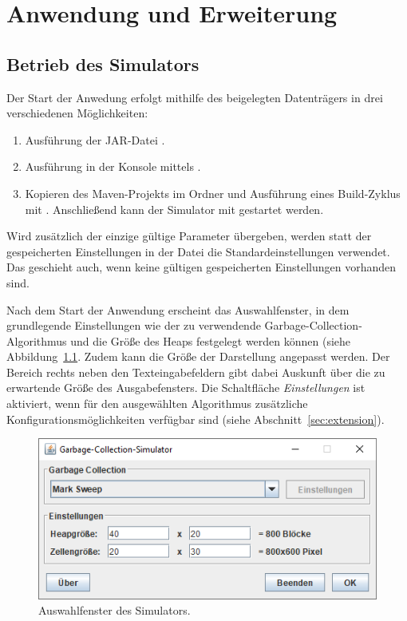 \chapter{Anwendung und Erweiterung}
\label{cha:application}


\section{Betrieb des Simulators}
\label{sec:execution}
Der Start der Anwedung erfolgt mithilfe des beigelegten Datenträgers in drei verschiedenen Möglichkeiten:
\begin{enumerate}
	\item Ausführung der JAR-Datei .
	\item Ausführung in der Konsole mittels .
	\item Kopieren des Maven-Projekts im Ordner  und Ausführung eines Build-Zyklus mit .
	Anschließend kann der Simulator mit  gestartet werden.
\end{enumerate}

Wird zusätzlich der einzige gültige Parameter  übergeben, werden statt der gespeicherten Einstellungen in der Datei  die Standardeinstellungen verwendet.
Das geschieht auch, wenn keine gültigen gespeicherten Einstellungen vorhanden sind.

Nach dem Start der Anwendung erscheint das Auswahlfenster, in dem grundlegende Einstellungen wie der zu verwendende Garbage-Collection-Algorithmus und die Größe des Heaps festgelegt werden können (siehe Abbildung~\ref{fig:app-start}.
Zudem kann die Größe der Darstellung angepasst werden.
Der Bereich rechts neben den Texteingabefeldern gibt dabei Auskunft über die zu erwartende Größe des Ausgabefensters.
Die Schaltfläche \textit{Einstellungen} ist aktiviert, wenn für den ausgewählten Algorithmus zusätzliche Konfigurationsmöglichkeiten verfügbar sind (siehe Abschnitt~\ref{sec:extension}).

\begin{figure}[h]
	\centering
	\includegraphics[scale=0.5]{img/gui/selection.png}
	\caption[Auswahlfenster des Simulators]{Auswahlfenster des Simulators.}
	\label{fig:app-start}
\end{figure}

